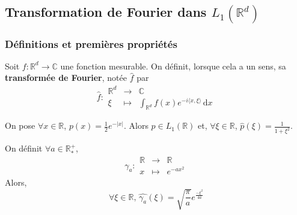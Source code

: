 



  \subsection{Transformation de Fourier dans \texorpdfstring{$L_1(\mathbb{R}^d)$}{L₁(Rᵈ)}}

  \subsubsection{Définitions et premières propriétés}


  \begin{definition}
    Soit $f : \mathbb{R}^d \rightarrow \mathbb{C}$ une fonction mesurable. On définit, lorsque cela a un sens, sa \textbf{transformée de Fourier}, notée $\widehat{f}$ par
    \[
    \widehat{f} :
    \begin{array}{ccc}
      \mathbb{R}^d &\rightarrow& \mathbb{C} \\
      \xi &\mapsto& \int_{\mathbb{R}^d} f(x) e^{-i\langle x, \xi \rangle} \, \mathrm{d}x
    \end{array}
    \]
  \end{definition}

  \begin{example}
    On pose $\forall x \in \mathbb{R}$, $p(x) = \frac{1}{2} e^{-|x|}$. Alors $p \in L_1(\mathbb{R})$ et, $\forall \xi \in \mathbb{R}$, $\widehat{p}(\xi) = \frac{1}{1+\xi^2}$.
  \end{example}


  \begin{example}
    \label{250-1}
    On définit $\forall a \in \mathbb{R}^+_*$,
    \[ \gamma_a :
    \begin{array}{ccc}
      \mathbb{R} &\rightarrow& \mathbb{R} \\
      x &\mapsto& e^{-ax^2}
    \end{array}
    \]
    Alors,
    \[ \forall \xi \in \mathbb{R}, \, \widehat{\gamma_a}(\xi) = \sqrt{\frac{\pi}{a}} e^{\frac{- \xi^2}{4a}} \]
  \end{example}


